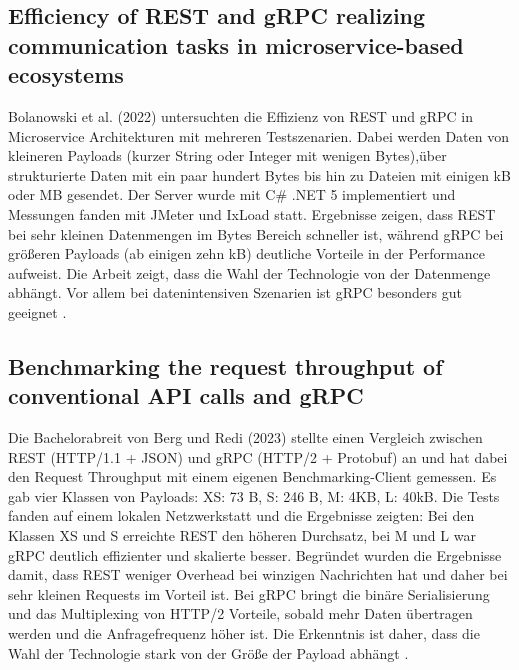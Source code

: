 \subsection{Efficiency of REST and gRPC realizing communication tasks in microservice-based ecosystems}
Bolanowski et al. (2022) untersuchten die Effizienz von REST und gRPC in Microservice Architekturen mit mehreren Testszenarien. Dabei werden Daten von kleineren Payloads (kurzer String oder Integer mit wenigen Bytes),über strukturierte Daten mit ein paar hundert Bytes bis hin zu Dateien mit einigen kB oder MB gesendet. Der Server wurde mit C\# .NET 5 implementiert und Messungen fanden mit JMeter und IxLoad statt.
Ergebnisse zeigen, dass REST bei sehr kleinen Datenmengen im Bytes Bereich schneller ist, während gRPC bei größeren Payloads (ab einigen zehn kB) deutliche Vorteile in der Performance aufweist. Die Arbeit zeigt, dass die Wahl der Technologie von der Datenmenge abhängt. Vor allem bei datenintensiven Szenarien ist gRPC besonders gut geeignet \parencite{Bolanowski2022Efficiency}.

\subsection{Benchmarking the request throughput of conventional API calls and gRPC}
Die Bachelorabreit von Berg und Redi (2023) stellte einen Vergleich zwischen REST (HTTP/1.1 + JSON) und gRPC (HTTP/2 + Protobuf) an und hat dabei den Request Throughput mit einem eigenen Benchmarking-Client gemessen. Es gab vier Klassen von Payloads:
XS: 73 B, S: 246 B, M: 4KB, L: 40kB.
Die Tests fanden auf einem lokalen Netzwerkstatt und die Ergebnisse zeigten: 
Bei den Klassen XS und S erreichte REST den höheren Durchsatz, bei M und L war gRPC deutlich effizienter und skalierte besser. Begründet wurden die Ergebnisse damit, dass REST weniger Overhead bei winzigen Nachrichten hat und daher bei sehr kleinen Requests im Vorteil ist. Bei gRPC bringt die binäre Serialisierung und das Multiplexing von HTTP/2 Vorteile, sobald mehr Daten übertragen werden und die Anfragefrequenz höher ist. Die Erkenntnis ist daher, dass die Wahl der Technologie stark von der Größe der Payload abhängt \parencite{BergRedi2023Benchmarking}.

